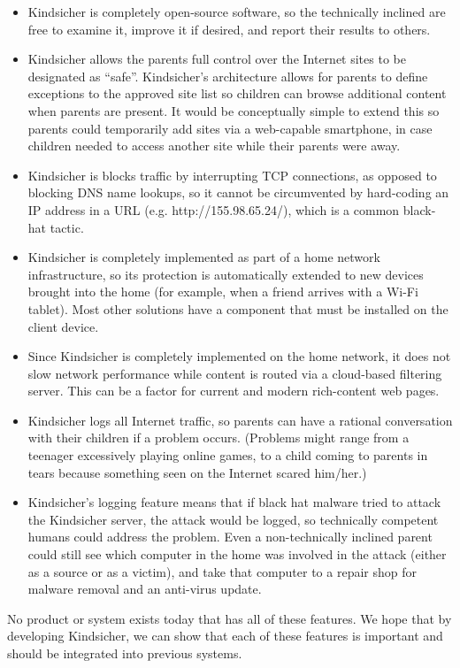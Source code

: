 \begin{itemize}

\item Kindsicher is completely open-source software, so the
technically inclined are free to examine it, improve it if desired,
and report their results to others.

\item Kindsicher allows the parents full control over the Internet sites to be
designated as ``safe''.
%
Kindsicher's architecture allows for parents to define exceptions to the
approved site list so children can browse additional content when parents
are present.
%
It would be conceptually simple to extend this so parents could temporarily
add sites via a web-capable smartphone, in case children needed to access
another site while their parents were away.

\item Kindsicher is blocks traffic by interrupting TCP connections, as
opposed to blocking DNS name lookups, so it cannot be circumvented
by hard-coding an IP address in a URL (e.g. http://155.98.65.24/),
which is a common black-hat tactic.

\item Kindsicher is completely implemented as part of a home network
infrastructure, so its protection is automatically extended to new
devices brought into the home (for example, when a friend arrives
with a Wi-Fi tablet). Most other solutions have a component that
must be installed on the client device.

\item Since Kindsicher is completely implemented on the home
network, it does not slow network performance while content is
routed via a cloud-based filtering server.  This can be a factor for
current and modern rich-content web pages.

\item Kindsicher logs all Internet traffic, so parents can have a rational
conversation with their children if a problem occurs.
%
(Problems might range from a teenager excessively playing online games, to a
child coming to parents in tears because something seen on the Internet
scared him/her.)

\item Kindsicher's logging feature means that if black hat malware tried to
attack the Kindsicher server, the attack would be logged, so technically
competent humans could address the problem.
%
Even a non-technically inclined parent could still see which computer in the
home was involved in the attack (either as a source or as a victim), and take
that computer to a repair shop for malware removal and an anti-virus update.

\end{itemize}

No product or system exists today that has all of these features. We hope that by developing Kindsicher, we can show that each of these features is important and should be integrated into previous systems.
